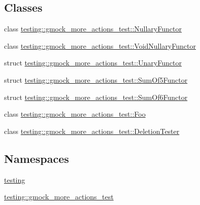 \subsection*{Classes}
\begin{DoxyCompactItemize}
\item 
class \hyperlink{classtesting_1_1gmock__more__actions__test_1_1NullaryFunctor}{testing\+::gmock\+\_\+more\+\_\+actions\+\_\+test\+::\+Nullary\+Functor}
\item 
class \hyperlink{classtesting_1_1gmock__more__actions__test_1_1VoidNullaryFunctor}{testing\+::gmock\+\_\+more\+\_\+actions\+\_\+test\+::\+Void\+Nullary\+Functor}
\item 
struct \hyperlink{structtesting_1_1gmock__more__actions__test_1_1UnaryFunctor}{testing\+::gmock\+\_\+more\+\_\+actions\+\_\+test\+::\+Unary\+Functor}
\item 
struct \hyperlink{structtesting_1_1gmock__more__actions__test_1_1SumOf5Functor}{testing\+::gmock\+\_\+more\+\_\+actions\+\_\+test\+::\+Sum\+Of5\+Functor}
\item 
struct \hyperlink{structtesting_1_1gmock__more__actions__test_1_1SumOf6Functor}{testing\+::gmock\+\_\+more\+\_\+actions\+\_\+test\+::\+Sum\+Of6\+Functor}
\item 
class \hyperlink{classtesting_1_1gmock__more__actions__test_1_1Foo}{testing\+::gmock\+\_\+more\+\_\+actions\+\_\+test\+::\+Foo}
\item 
class \hyperlink{classtesting_1_1gmock__more__actions__test_1_1DeletionTester}{testing\+::gmock\+\_\+more\+\_\+actions\+\_\+test\+::\+Deletion\+Tester}
\end{DoxyCompactItemize}
\subsection*{Namespaces}
\begin{DoxyCompactItemize}
\item 
 \hyperlink{namespacetesting}{testing}
\item 
 \hyperlink{namespacetesting_1_1gmock__more__actions__test}{testing\+::gmock\+\_\+more\+\_\+actions\+\_\+test}
\end{DoxyCompactItemize}
